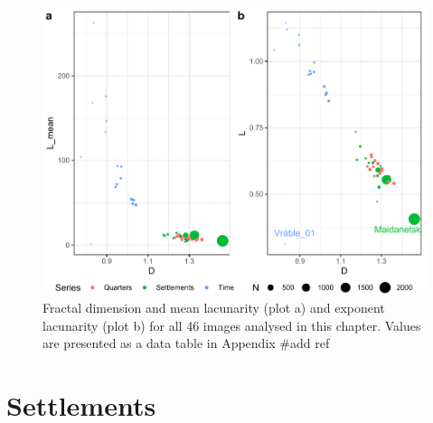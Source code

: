 \documentclass[
  12pt,
  a4paper, twoside]{book}
\begin{document}
\begin{figure}

{\centering \includegraphics[width=0.9\linewidth]{bookdown-demo_files/figure-latex/09-all-1} 

}

\caption[Fractal dimension and lacunarity estimates of all archaeological plan images]{Fractal dimension and mean lacunarity (plot a) and exponent lacunarity (plot b) for all 46 images analysed in this chapter. Values are presented as a data table in Appendix \#add ref}\label{fig:09-all}
\end{figure}

\hypertarget{settlements-1}{%
\section{Settlements}\label{settlements-1}}
\end{document}

